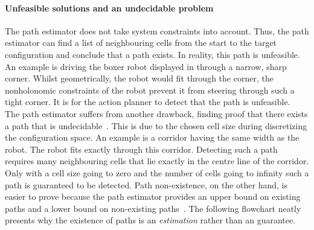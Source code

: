 \paragraph{Unfeasible solutions and an undecidable problem}
The path estimator does not take system constraints into account. Thus, the path estimator can find a list of neighbouring cells from the start to the target configuration and conclude that a path exists. In reality, this path is unfeasible. An example is driving the boxer robot displayed in  through a narrow, sharp corner. Whilst geometrically, the robot would fit through the corner, the nonholonomic constraints of the robot prevent it from steering through such a tight corner. It is for the action planner to detect that the path is unfeasible.\\

The path estimator suffers from another drawback, finding proof that there exists a path that is undecidable~\cite{zhang_simple_2008}. This is due to the chosen cell size during discretizing the configuration space. An example is a corridor having the same width as the robot. The robot fits exactly through this corridor. Detecting such a path requires many neighbouring cells that lie exactly in the centre line of the corridor. Only with a cell size going to zero and the number of cells going to infinity such a path is guaranteed to be detected. Path non-existence, on the other hand, is easier to prove because the path estimator provides an upper bound on existing paths and a lower bound on non-existing paths~\cite{zhang_simple_2008}. The following flowchart neatly presents why the existence of paths is an \textit{estimation} rather than an guarantee.\bs

